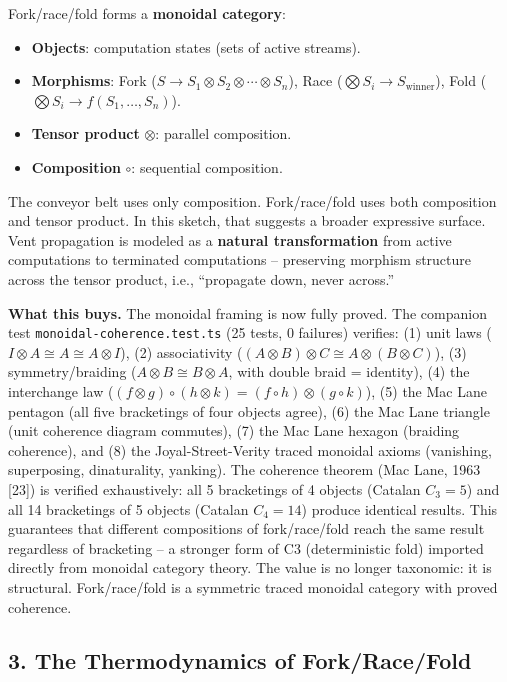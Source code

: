 \documentclass[
  11pt,
]{article}
\begin{document}
Fork/race/fold forms a \textbf{monoidal category}:

\begin{itemize}
\item
  \textbf{Objects}: computation states (sets of active streams).
\item
  \textbf{Morphisms}: Fork
  (\(S \to S_1 \otimes S_2 \otimes \cdots \otimes S_n\)), Race
  (\(\bigotimes S_i \to S_{\text{winner}}\)), Fold
  (\(\bigotimes S_i \to f(S_1, \ldots, S_n)\)).
\item
  \textbf{Tensor product} \(\otimes\): parallel composition.
\item
  \textbf{Composition} \(\circ\): sequential composition.
\end{itemize}

The conveyor belt uses only composition. Fork/race/fold uses both
composition and tensor product. In this sketch, that suggests a broader
expressive surface. Vent propagation is modeled as a \textbf{natural
transformation} from active computations to terminated computations --
preserving morphism structure across the tensor product, i.e.,
``propagate down, never across.''

\textbf{What this buys.} The monoidal framing is now fully proved. The
companion test \texttt{monoidal-coherence.test.ts} (25 tests, 0
failures) verifies: (1) unit laws
(\(I \otimes A \cong A \cong A \otimes I\)), (2) associativity
(\((A \otimes B) \otimes C \cong A \otimes (B \otimes C)\)), (3)
symmetry/braiding (\(A \otimes B \cong B \otimes A\), with double braid
= identity), (4) the interchange law
(\((f \otimes g) \circ (h \otimes k) = (f \circ h) \otimes (g \circ k)\)),
(5) the Mac Lane pentagon (all five bracketings of four objects agree),
(6) the Mac Lane triangle (unit coherence diagram commutes), (7) the Mac
Lane hexagon (braiding coherence), and (8) the Joyal-Street-Verity
traced monoidal axioms (vanishing, superposing, dinaturality, yanking).
The coherence theorem (Mac Lane, 1963 {[}23{]}) is verified
exhaustively: all 5 bracketings of 4 objects (Catalan \(C_3 = 5\)) and
all 14 bracketings of 5 objects (Catalan \(C_4 = 14\)) produce identical
results. This guarantees that different compositions of fork/race/fold
reach the same result regardless of bracketing -- a stronger form of C3
(deterministic fold) imported directly from monoidal category theory.
The value is no longer taxonomic: it is structural. Fork/race/fold is a
symmetric traced monoidal category with proved coherence.

\subsection{3. The Thermodynamics of
Fork/Race/Fold}\label{the-thermodynamics-of-forkracefold}
\end{document}

